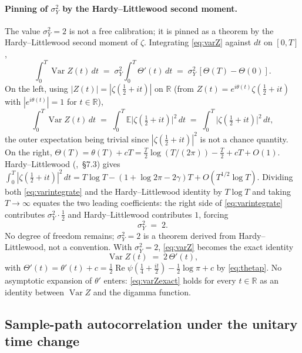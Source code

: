 \documentclass[11pt]{article}
\DeclareMathOperator{\ReOp}{Re}
\let\Re\ReOp
\DeclareMathOperator{\Var}{Var}
\begin{document}
\paragraph{Pinning of $\sigma_Y^{2}$ by the Hardy--Littlewood second moment.}
The value $\sigma_Y^{2}=2$ is not a free calibration; it is pinned as a theorem by the Hardy--Littlewood second moment of $\zeta$. Integrating \eqref{eq:varZ} against $dt$ on $[0,T]$,
\begin{equation}\label{eq:varintegrate}
\int_{0}^{T}\Var Z(t)\,dt \;=\; \sigma_Y^{2}\!\int_{0}^{T}\Theta'(t)\,dt \;=\; \sigma_Y^{2}\,[\Theta(T)-\Theta(0)].
\end{equation}
On the left, using $|Z(t)|=|\zeta(\tfrac{1}{2}+it)|$ on $\mathbb{R}$ (from $Z(t)=e^{i\theta(t)}\zeta(\tfrac{1}{2}+it)$ with $|e^{i\theta(t)}|=1$ for $t\in\mathbb{R}$),
\begin{equation}\label{eq:varintegrate2}
\int_{0}^{T}\Var Z(t)\,dt \;=\; \int_{0}^{T}\mathbb{E}\bigl|\zeta(\tfrac{1}{2}+it)\bigr|^{2}\,dt \;=\; \int_{0}^{T}\bigl|\zeta(\tfrac{1}{2}+it)\bigr|^{2}\,dt,
\end{equation}
the outer expectation being trivial since $|\zeta(\tfrac{1}{2}+it)|^{2}$ is not a chance quantity. On the right, $\Theta(T)=\theta(T)+cT=\tfrac{T}{2}\log(T/(2\pi))-\tfrac{T}{2}+cT+O(1)$. Hardy--Littlewood (\cite{Titchmarsh},~\S7.3) gives $\int_{0}^{T}|\zeta(\tfrac{1}{2}+it)|^{2}\,dt = T\log T - (1+\log 2\pi - 2\gamma)T + O(T^{1/2}\log T)$. Dividing both \eqref{eq:varintegrate} and the Hardy--Littlewood identity by $T\log T$ and taking $T\to\infty$ equates the two leading coefficients: the right side of \eqref{eq:varintegrate} contributes $\sigma_Y^{2}\cdot\tfrac{1}{2}$ and Hardy--Littlewood contributes $1$, forcing
\begin{equation}\label{eq:sigmaYfixed}
\sigma_Y^{2} \;=\; 2.
\end{equation}
No degree of freedom remains; $\sigma_Y^{2}=2$ is a theorem derived from Hardy--Littlewood, not a convention. With $\sigma_Y^{2}=2$, \eqref{eq:varZ} becomes the exact identity
\begin{equation}\label{eq:varZexact}
\Var Z(t) \;=\; 2\,\Theta'(t),
\end{equation}
with $\Theta'(t)=\theta'(t)+c=\tfrac{1}{2}\Re\psi(\tfrac{1}{4}+\tfrac{it}{2})-\tfrac{1}{2}\log\pi+c$ by \eqref{eq:thetap}. No asymptotic expansion of $\theta'$ enters: \eqref{eq:varZexact} holds for every $t\in\mathbb{R}$ as an identity between $\Var Z$ and the digamma function.

\subsection{Sample-path autocorrelation under the unitary time change}\label{app:sampleautocorr}
\end{document}
